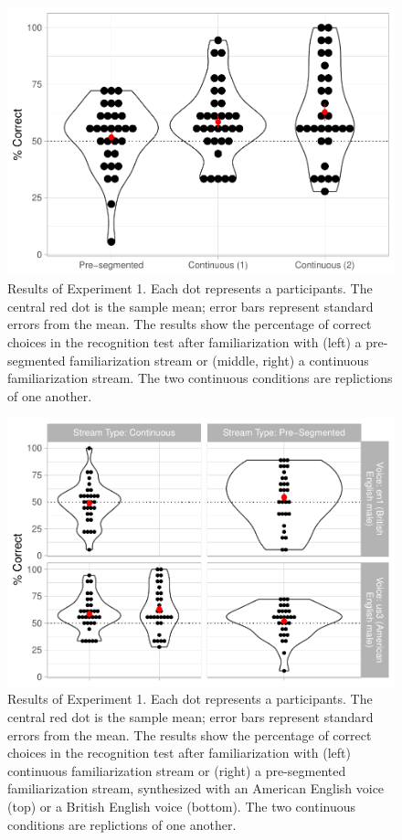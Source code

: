 \documentclass[
]{article}
\begin{document}
\begin{figure}

{\centering \includegraphics[width=0.8\linewidth]{segmentation_recall_combined_for_revision_files/figure-latex/stats-london-stats.3x.us.segm.cont.plot-1} 

}

\caption{Results of Experiment 1. Each dot represents a participants. The central red dot is the sample mean; error bars represent standard errors from the mean. The results show the percentage of correct choices in the recognition test after familiarization with (left) a pre-segmented familiarization stream or (middle, right) a continuous familiarization stream. The two continuous conditions are replictions of one another.}\label{fig:stats-london-stats.3x.us.segm.cont.plot}
\end{figure}

\begin{figure}

{\centering \includegraphics[width=0.8\linewidth]{segmentation_recall_combined_for_revision_files/figure-latex/stats-london-stats.3x.us.en.segm.cont.combined.plot-1} 

}

\caption{Results of Experiment 1. Each dot represents a participants. The central red dot is the sample mean; error bars represent standard errors from the mean. The results show the percentage of correct choices in the recognition test after familiarization with (left) continuous familiarization stream or (right) a pre-segmented familiarization stream, synthesized with an American English voice (top) or a British English voice (bottom). The two continuous conditions are replictions of one another.}\label{fig:stats-london-stats.3x.us.en.segm.cont.combined.plot}
\end{figure}
\end{document}

